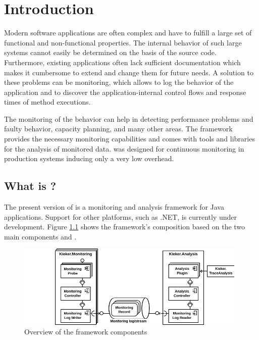 % 


\chapter{Introduction}\label{chap:introduction}

Modern software applications are often complex and have to fulfill a large set of functional and non-functional properties. The internal behavior of such large systems cannot easily be determined on the basis of the source code. Furthermore, existing applications often lack sufficient documentation which makes it cumbersome to extend and change them for future needs. A solution to these problems can be monitoring, which allows to log the behavior of the application and to discover the application-internal control flows and response times of method executions.

The monitoring of the behavior can help in detecting performance problems and faulty behavior, capacity planning, and many other areas. The \Kieker{} framework provides the necessary monitoring capabilities and comes with tools and libraries for the analysis of monitored data. \Kieker{} was designed for %
continuous monitoring in production systems inducing only a very low overhead. 

\section{What is \Kieker?}\label{sec:kieker}

The present version of \Kieker{} is a monitoring and analysis framework for %
Java applications. %
Support for other platforms, such as .NET, is currently under development. %
Figure \ref{fig:KiekerComponentDiagram} shows the framework's composition based %
on the two main components \KiekerMonitoringPart{} and \KiekerAnalysisPart{}. %

\begin{figure}[H]\centering
\includegraphics[width=0.98\textwidth]{images/kiekerComponentDiagram-woCloud-bw-w-record-newNames-withTraceAnalysis}
\caption{Overview of the framework components}
\label{fig:KiekerComponentDiagram}
\end{figure}
		
